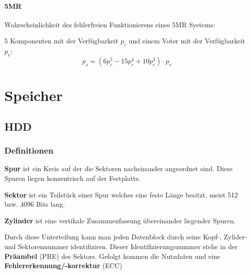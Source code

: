 \documentclass[a4paper, landscape]{article}
\newcommand*\spaceline{\par\vspace{\belowdisplayskip}}
\begin{document}
\begin{multicols}{3}
        \paragraph{5MR} Wahrscheinlichkeit des fehlerfreien Funktionierens eines 5MR Systems:\par 
        5 Komponenten mit der Verfügbarkeit $p_{c}$ und einem Voter mit der Verfügbarkeit $p_{v}$:
        \[
         p_{s} = \left(6 p_{c}^{5} - 15 p_{c}^{4} + 10 p_{c}^{3} \right) \cdot p_{v}
        \]
        
        \section{Speicher}
        
        \subsection{HDD}
        
        \subsubsection{Definitionen}
        \textbf{Spur} ist ein Kreis auf der die Sektoren nacheinander angeordnet sind. Diese Spuren liegen konzentrisch auf der Festplatte.
        \spaceline
        \textbf{Sektor} ist ein Teilstück einer Spur welches eine feste Länge besitzt, meist 512 bzw. 4096 Bits lang.
        \spaceline
        \textbf{Zylinder} ist eine vertikale Zusammenfassung übereinander liegender Spuren.
        \spaceline
        Durch diese Unterteilung kann man jeden Datenblock durch seine Kopf-, Zylider- und Sektorennummer identifiziren. 
        Dieser Identifizierungsnummer stehe in der \textbf{Präambel} (PRE) des Sektors. 
        Gefolgt kommen die Nutzdaten und eine \textbf{Fehlererkennung/-korrektur} (ECC)
        
        \begin{center}
        \end{center}


\end{multicols}
\end{document}
